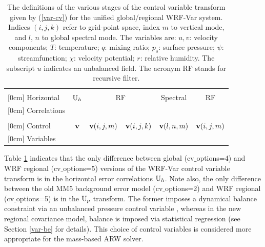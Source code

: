 \begin{table}[h]
\begin{center}
\begin{tabular}{|l|l|l|l|l|l|}
 \multicolumn{1}{c|}{ } &
 \multicolumn{2}{c|}{ } &
 \multicolumn{1}{c|}{ } &
 \multicolumn{1}{c|}{ }\\
 \raisebox{1.5ex}[0cm] {Horizontal} &
 \multicolumn{1}{c|}{${\rm U}_h$} &
 \multicolumn{2}{c|}{RF} &
 \multicolumn{1}{c|}{Spectral} &
 \multicolumn{1}{c|}{RF}\\
 \raisebox{1.5ex}[0cm] {Correlations} &
 \multicolumn{1}{c|}{ } &
 \multicolumn{2}{c|}{ } &
 \multicolumn{1}{c|}{ } &
 \multicolumn{1}{c|}{ }\\
 \hline
 { } &
 \multicolumn{1}{c|}{ } &
 \multicolumn{2}{c|}{ } &
 \multicolumn{1}{c|}{ } &
 \multicolumn{1}{c|}{ }\\
 \raisebox{1.5ex}[0cm] {Control} &
 \multicolumn{1}{c|}{${\bf v}$ } &
 \multicolumn{1}{c|}{${\bf v}(i,j,m)$} &
 \multicolumn{1}{c|}{${\bf v}(i,j,k)$} &
 \multicolumn{1}{c|}{${\bf v}(l,n,m)$} &
 \multicolumn{1}{c|}{${\bf v}(i,j,m)$}\\
 \raisebox{1.5ex}[0cm] {Variables} &
 \multicolumn{1}{c|}{ } &
 \multicolumn{2}{c|}{ } &
 \multicolumn{1}{c|}{ } &
 \multicolumn{1}{c|}{ }\\
 \hline
\end{tabular}
\end{center}
\caption{The definitions of the various stages of the control
     variable transform given by (\ref{var-cv}) for the unified global/regional
     WRF-Var system. Indices $(i,j,k)$ refer to grid-point
     space, index $m$ to vertical mode, and $l$, $n$ to global spectral mode.
     The variables are: $u, v$: velocity components; $T$: temperature; $q$: mixing ratio;
     $p_s$: surface pressure; $\psi$: streamfunction; $\chi$: velocity potential;
     $r$: relative humidity. The subscript $u$ indicates an unbalanced field. The acronym RF stands for recursive filter.}
\label{var-cvtable}
\end{table}

Table \ref{var-cvtable} indicates that the only difference between global (cv$\_$options=4) and WRF 
regional (cv$\_$options=5) versions of the WRF-Var control variable 
transform is in the horizontal error correlations ${\rm U}_{h}$. 
Note also, the only difference between the old MM5 
background error model (cv$\_$options=2) and WRF regional (cv$\_$options=5) is in the 
${\rm U}_{p}$ transform. The former imposes a dynamical balance constraint via an 
unbalanced pressure control variable \citep{barker04}, whereas in the new regional 
covariance model, balance is imposed via statistical regression (see Section \ref{var-be} for 
details). This choice of control variables is considered more appropriate for the 
mass-based ARW solver.

